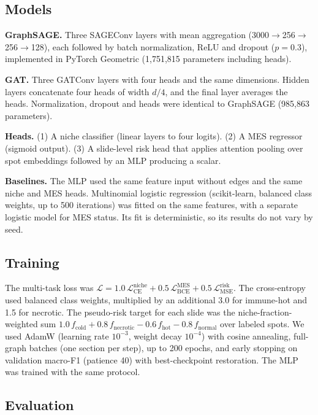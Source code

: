 \documentclass[11pt,letterpaper]{article}
\begin{document}
\subsection{Models}

\textbf{GraphSAGE.} Three SAGEConv layers \cite{hamilton2017} with mean aggregation (3000$\rightarrow$256$\rightarrow$256$\rightarrow$128), each followed by batch normalization, ReLU and dropout ($p = 0.3$), implemented in PyTorch Geometric \cite{fey2019} (1{,}751{,}815 parameters including heads).

\textbf{GAT.} Three GATConv layers \cite{velickovic2018} with four heads and the same dimensions. Hidden layers concatenate four heads of width $d/4$, and the final layer averages the heads. Normalization, dropout and heads were identical to GraphSAGE (985{,}863 parameters).

\textbf{Heads.} (1) A niche classifier (linear layers to four logits). (2) A MES regressor (sigmoid output). (3) A slide-level risk head that applies attention pooling over spot embeddings followed by an MLP producing a scalar.

\textbf{Baselines.} The MLP used the same feature input without edges and the same niche and MES heads. Multinomial logistic regression (scikit-learn, balanced class weights, up to 500 iterations) was fitted on the same features, with a separate logistic model for MES status. Its fit is deterministic, so its results do not vary by seed.

\subsection{Training}

The multi-task loss was $\mathcal{L} = 1.0\,\mathcal{L}_\mathrm{CE}^\mathrm{niche} + 0.5\,\mathcal{L}_\mathrm{BCE}^\mathrm{MES} + 0.5\,\mathcal{L}_\mathrm{MSE}^\mathrm{risk}$. The cross-entropy used balanced class weights, multiplied by an additional 3.0 for immune-hot and 1.5 for necrotic. The pseudo-risk target for each slide was the niche-fraction-weighted sum $1.0\,f_\mathrm{cold} + 0.8\,f_\mathrm{necrotic} - 0.6\,f_\mathrm{hot} - 0.8\,f_\mathrm{normal}$ over labeled spots. We used AdamW (learning rate $10^{-3}$, weight decay $10^{-4}$) with cosine annealing, full-graph batches (one section per step), up to 200 epochs, and early stopping on validation macro-F1 (patience 40) with best-checkpoint restoration. The MLP was trained with the same protocol.

\subsection{Evaluation}
\end{document}
